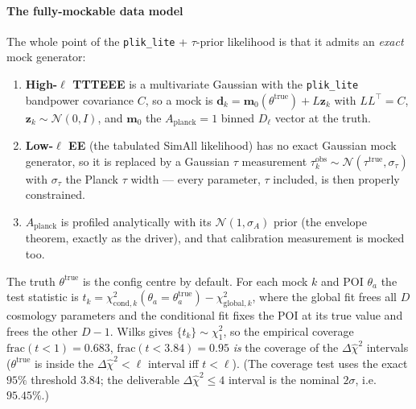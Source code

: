 \documentclass[11pt]{article}
\newcommand{\code}[1]{\texttt{\small #1}}
\newcommand{\chisq}{\chi^2}
\newcommand{\dchisq}{\Delta\hat\chi^2}
\begin{document}
\paragraph{The fully-mockable data model}
The whole point of the \code{plik\_lite} + $\tau$-prior likelihood is that it
admits an \emph{exact} mock generator:
\begin{enumerate}[leftmargin=2em,itemsep=1pt]
\item \textbf{High-$\ell$ TTTEEE} is a multivariate Gaussian with the
\code{plik\_lite} bandpower covariance $C$, so a mock is
$\bm d_k = \bm m_0(\theta^{\mathrm{true}}) + L\bm z_k$ with $LL^\top=C$,
$\bm z_k\sim\mathcal N(0,I)$, and $\bm m_0$ the $A_{\mathrm{planck}}{=}1$
binned $D_\ell$ vector at the truth.
\item \textbf{Low-$\ell$ EE} (the tabulated SimAll likelihood) has no exact
Gaussian mock generator, so it is replaced by a Gaussian $\tau$
measurement $\tau^{\mathrm{obs}}_k\sim\mathcal N(\tau^{\mathrm{true}},
\sigma_\tau)$ with $\sigma_\tau$ the Planck $\tau$ width --- every
parameter, $\tau$ included, is then properly constrained.
\item \textbf{$A_{\mathrm{planck}}$} is profiled analytically with its
$\mathcal N(1,\sigma_A)$ prior (the envelope theorem, exactly as the
driver), and that calibration measurement is mocked too.
\end{enumerate}
The truth $\theta^{\mathrm{true}}$ is the config centre by default. For each
mock $k$ and POI $\theta_a$ the test statistic is
$t_k = \chisq_{\mathrm{cond},k}(\theta_a{=}\theta_a^{\mathrm{true}}) -
\chisq_{\mathrm{global},k}$, where the global fit frees all $D$ cosmology
parameters and the conditional fit fixes the POI at its true value and frees
the other $D{-}1$. Wilks gives $\{t_k\}\sim\chisq_1$, so the empirical
coverage $\mathrm{frac}(t<1)=0.683$, $\mathrm{frac}(t<3.84)=0.95$ \emph{is}
the coverage of the $\dchisq$ intervals ($\theta^{\mathrm{true}}$ is inside
the $\dchisq<\ell$ interval iff $t<\ell$). (The coverage test uses the exact
$95\%$ threshold $3.84$; the deliverable $\dchisq\le4$ interval is the
nominal $2\sigma$, i.e.\ $95.45\%$.)
\end{document}
